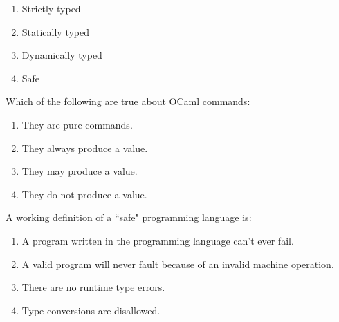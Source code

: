 \documentclass[addpoints,11pt]{exam}
\begin{document}
\begin{questions}
\begin{enumerate}
\item Strictly typed
\item Statically typed
\item Dynamically typed
\item Safe
\end{enumerate}\question Which of the following are true about OCaml commands:
\begin{enumerate}
\item They are pure commands.
\item They always produce a value.
\item They may produce a value.
\item They do not produce a value.
\end{enumerate}\question A working definition of a ``safe" programming language is:
\begin{enumerate}
\item A program written in the programming language can't ever fail.
\item A valid program will never fault because of an invalid machine operation.
\item There are no runtime type errors.
\item Type conversions are disallowed.
\end{enumerate}\end{questions}
\end{document}
